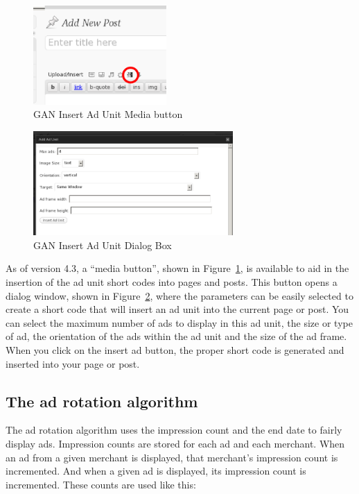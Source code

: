 \documentclass[letterpaper]{article}
\begin{document}
\begin{figure}[ht]
\begin{centering}
\includegraphics[width=2in]{ganmediabutton.png}
\caption{GAN Insert Ad Unit Media button}
\label{fig:ganmediabutton}
\end{centering}
\end{figure}
\begin{figure}[ht]
\begin{centering}
\includegraphics[width=3in]{ganinsertaddialog.png}
\caption{GAN Insert Ad Unit Dialog Box}
\label{fig:ganinsertaddialog}
\end{centering}
\end{figure}
As of version 4.3, a ``media button'', shown in
Figure~\ref{fig:ganmediabutton}, is available to aid in the insertion
of the ad unit short codes into pages and posts.  This button opens a
dialog window, shown in Figure~\ref{fig:ganinsertaddialog}, where the
parameters can be easily selected to create a short code that will
insert an ad unit into the current page or post. You can select the
maximum number of ads to display in this ad unit, the size or type of
ad, the orientation of the ads within the ad unit and the size of the
ad frame. When you click on the insert ad button, the proper short code
is generated and inserted into your page or post.

\subsection{The ad rotation algorithm}

The ad rotation algorithm uses the impression count and the end date to
fairly display ads.  Impression counts are stored for each ad and each
merchant.  When an ad from a given merchant is displayed, that
merchant's impression count is incremented.  And when a given ad is
displayed, its impression count is incremented.  These counts are used
like this:
\end{document}
